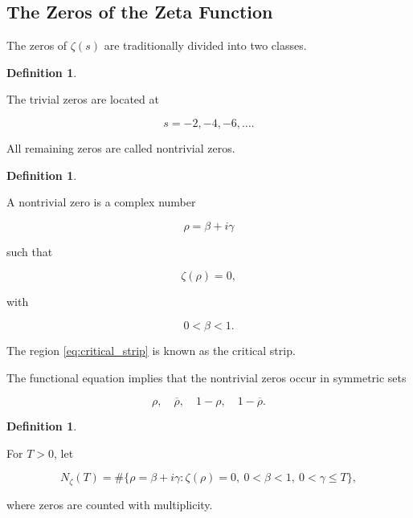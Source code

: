 \documentclass[11pt]{amsart}
\numberwithin{equation}{section}
\theoremstyle{plain}
\theoremstyle{definition}
\newtheorem{definition}[theorem]{Definition}
\theoremstyle{remark}
\begin{document}
\subsection{The Zeros of the Zeta Function}
\label{subsec:zeta_zeros}

The zeros of
$\zeta(s)$
are traditionally divided into two classes.

\begin{definition}
\label{def:trivial_zeros}

The trivial zeros are located at

\begin{equation}
s=-2,-4,-6,\ldots.
\label{eq:trivial_zeros}
\end{equation}

\end{definition}

All remaining zeros are called nontrivial zeros.

\begin{definition}
\label{def:nontrivial_zero}

A nontrivial zero is a complex number

\begin{equation}
\rho
=
\beta+i\gamma
\label{eq:rho_definition}
\end{equation}

such that

\begin{equation}
\zeta(\rho)=0,
\label{eq:rho_zero_condition}
\end{equation}

with

\begin{equation}
0<\beta<1.
\label{eq:critical_strip}
\end{equation}

\end{definition}

The region
\eqref{eq:critical_strip}
is known as the critical strip.

The functional equation implies that the nontrivial zeros occur in
symmetric sets

\begin{equation}
\rho,
\quad
\overline{\rho},
\quad
1-\rho,
\quad
1-\overline{\rho}.
\label{eq:zero_symmetry}
\end{equation}

\begin{definition}
\label{def:zeta_zero_counting_function}

For \(T>0\), let

\begin{equation}
N_\zeta(T)
=
\#\{\rho=\beta+i\gamma:\zeta(\rho)=0,\ 0<\beta<1,\ 0<\gamma\leq T\},
\label{eq:zeta_zero_counting_function}
\end{equation}

where zeros are counted with multiplicity.

\end{definition}
\end{document}
